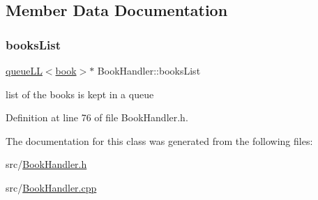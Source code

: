 \subsection{Member Data Documentation}
\mbox{\label{class_book_handler_a13a6c78422b3ad7acd5ebdb9555a0286}} 
\subsubsection{\texorpdfstring{books\+List}{booksList}}
{\footnotesize\ttfamily \hyperlink{classqueue_l_l}{queue\+LL}$<$\hyperlink{classbook}{book}$>$$\ast$ Book\+Handler\+::books\+List\hspace{0.3cm}{\ttfamily [private]}}

list of the books is kept in a queue 

Definition at line 76 of file Book\+Handler.\+h.



The documentation for this class was generated from the following files\+:\begin{DoxyCompactItemize}
\item 
src/\hyperlink{_book_handler_8h}{Book\+Handler.\+h}\item 
src/\hyperlink{_book_handler_8cpp}{Book\+Handler.\+cpp}\end{DoxyCompactItemize}
